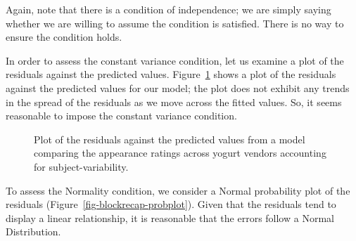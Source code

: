 \documentclass[
  letterpaper,
  DIV=11,
  numbers=noendperiod]{scrreprt}
\theoremstyle{plain}
\theoremstyle{definition}
\theoremstyle{definition}
\theoremstyle{remark}
\begin{document}
Again, note that there is a condition of independence; we are simply
saying whether we are willing to assume the condition is satisfied.
There is no way to ensure the condition holds.

In order to assess the constant variance condition, let us examine a
plot of the residuals against the predicted values.
Figure~\ref{fig-blockrecap-resids} shows a plot of the residuals against
the predicted values for our model; the plot does not exhibit any trends
in the spread of the residuals as we move across the fitted values. So,
it seems reasonable to impose the constant variance condition.

\begin{figure}


\caption{\label{fig-blockrecap-resids}Plot of the residuals against the
predicted values from a model comparing the appearance ratings across
yogurt vendors accounting for subject-variability.}

\end{figure}%

To assess the Normality condition, we consider a Normal probability plot
of the residuals (Figure~\ref{fig-blockrecap-probplot}). Given that the
residuals tend to display a linear relationship, it is reasonable that
the errors follow a Normal Distribution.
\end{document}

